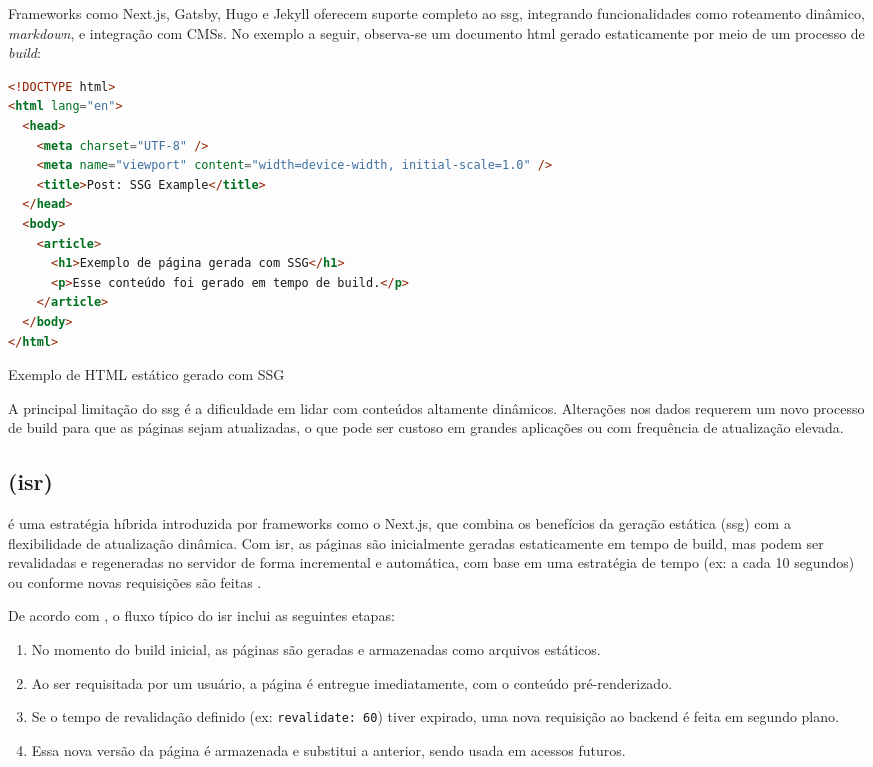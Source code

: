 Frameworks como Next.js, Gatsby, Hugo e Jekyll oferecem suporte completo ao \acrshort{ssg}, integrando funcionalidades como roteamento dinâmico, \emph{markdown}, e integração com CMSs. No exemplo a seguir, observa-se um documento \acrshort{html} gerado estaticamente por meio de um processo de \emph{build}:

\begin{codigo}[H]
  \begin{lstlisting}[language=html]
<!DOCTYPE html>
<html lang="en">
  <head>
    <meta charset="UTF-8" />
    <meta name="viewport" content="width=device-width, initial-scale=1.0" />
    <title>Post: SSG Example</title>
  </head>
  <body>
    <article>
      <h1>Exemplo de página gerada com SSG</h1>
      <p>Esse conteúdo foi gerado em tempo de build.</p>
    </article>
  </body>
</html>
  \end{lstlisting}
  \caption{Exemplo de HTML estático gerado com SSG}
  \label{cod:ssg_example}
\end{codigo}

A principal limitação do \acrshort{ssg} é a dificuldade em lidar com conteúdos altamente dinâmicos. Alterações nos dados requerem um novo processo de build para que as páginas sejam atualizadas, o que pode ser custoso em grandes aplicações ou com frequência de atualização elevada.

\subsection{ (\acrshort{isr})}
\label{subsec:isr}

 é uma estratégia híbrida introduzida por frameworks como o Next.js, que combina os benefícios da geração estática (\acrshort{ssg}) com a flexibilidade de atualização dinâmica. Com \acrshort{isr}, as páginas são inicialmente geradas estaticamente em tempo de build, mas podem ser revalidadas e regeneradas no servidor de forma incremental e automática, com base em uma estratégia de tempo (ex: a cada 10 segundos) ou conforme novas requisições são feitas \cite{pahan2021}.

De acordo com , o fluxo típico do \acrshort{isr} inclui as seguintes etapas:

\begin{enumerate}
    \item No momento do build inicial, as páginas são geradas e armazenadas como arquivos estáticos.
    \item Ao ser requisitada por um usuário, a página é entregue imediatamente, com o conteúdo pré-renderizado.
    \item Se o tempo de revalidação definido (ex: \texttt{revalidate: 60}) tiver expirado, uma nova requisição ao backend é feita em segundo plano.
    \item Essa nova versão da página é armazenada e substitui a anterior, sendo usada em acessos futuros.
\end{enumerate}

